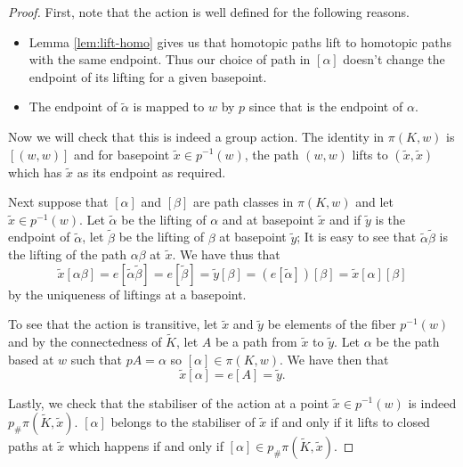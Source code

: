 \documentclass[12pt]{article}
\theoremstyle{definition}
\numberwithin{equation}{theorem}
\begin{document}
\begin{proof}
  First, note that the action is well defined for the following reasons.
  \begin{itemize}
  \item Lemma \ref{lem:lift-homo} gives us that homotopic paths lift to homotopic paths with the same endpoint. Thus our choice of path in $[\alpha]$ doesn't change the endpoint of its lifting for a given basepoint.
  \item The endpoint of $\tilde{\alpha}$ is mapped to $w$ by $p$ since that is the endpoint of $\alpha$.
  \end{itemize}
  
  Now we will check that this is indeed a group action. The identity in $\pi(K,w)$ is $[(w,w)]$ and for basepoint $\tilde{x} \in p^{-1}(w)$, the path $(w,w)$ lifts to $(\tilde{x},\tilde{x})$ which has $\tilde{x}$ as its endpoint as required.

  Next suppose that $[\alpha]$ and $[\beta]$ are path classes in $\pi(K,w)$ and let $\tilde{x} \in p^{-1}(w)$. Let $\tilde{\alpha}$ be the lifting of $\alpha$ and at basepoint $\tilde{x}$ and if $\tilde{y}$ is the endpoint of $\tilde{\alpha}$, let $\tilde{\beta}$ be the lifting of $\beta$ at basepoint $\tilde{y}$; It is easy to see that $\tilde{\alpha}\tilde{\beta}$ is the lifting of the path $\alpha\beta$ at $\tilde{x}$. We have thus that
  \begin{equation*}
    \tilde{x}[\alpha\beta] = e[\tilde{\alpha}\tilde{\beta}] = e[\tilde{\beta}] = \tilde{y}[\beta] = (e[\tilde{\alpha}])[\beta] = \tilde{x}[\alpha][\beta]
  \end{equation*}
  by the uniqueness of liftings at a basepoint.

  To see that the action is transitive, let $\tilde{x}$ and $\tilde{y}$ be elements of the fiber $p^{-1}(w)$ and by the connectedness of $\tilde{K}$, let $A$ be a path from $\tilde{x}$ to $\tilde{y}$. Let $\alpha$ be the path based at $w$ such that $pA = \alpha$ so $[\alpha] \in \pi(K,w)$. We have then that
  \begin{equation*}
    \tilde{x}[\alpha] = e[A] = \tilde{y}.
  \end{equation*}

  Lastly, we check that the stabiliser of the action at a point $\tilde{x} \in p^{-1}(w)$ is indeed $p_{\#}\pi(\tilde{K},\tilde{x})$. $[\alpha]$ belongs to the stabiliser of $\tilde{x}$ if and only if it lifts to closed paths at $\tilde{x}$ which happens if and only if $[\alpha] \in p_{\#}\pi(\tilde{K},\tilde{x})$.
\end{proof}
\end{document}

